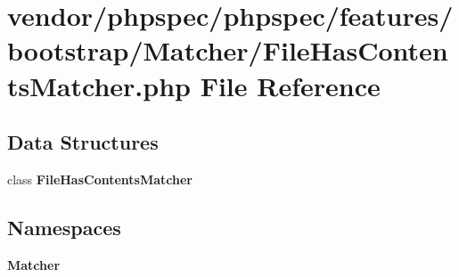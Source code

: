 \section{vendor/phpspec/phpspec/features/bootstrap/\+Matcher/\+File\+Has\+Contents\+Matcher.php File Reference}
\label{_file_has_contents_matcher_8php}
\subsection*{Data Structures}
\begin{DoxyCompactItemize}
\item 
class {\bf File\+Has\+Contents\+Matcher}
\end{DoxyCompactItemize}
\subsection*{Namespaces}
\begin{DoxyCompactItemize}
\item 
 {\bf Matcher}
\end{DoxyCompactItemize}
